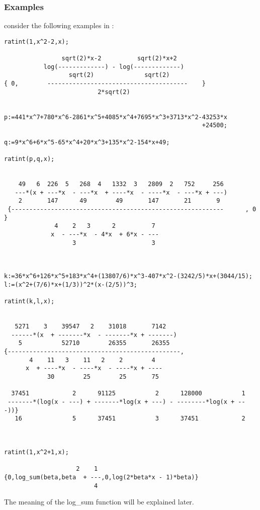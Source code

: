 \subsubsection{Examples}
consider the following examples in \REDUCE:
\begin{verbatim}
ratint(1,x^2-2,x);

                sqrt(2)*x-2          sqrt(2)*x+2
           log(-------------) - log(-------------)
                  sqrt(2)              sqrt(2)
{ 0,        ---------------------------------------    }
                          2*sqrt(2)


p:=441*x^7+780*x^6-2861*x^5+4085*x^4+7695*x^3+3713*x^2-43253*x
                                                       +24500;

q:=9*x^6+6*x^5-65*x^4+20*x^3+135*x^2-154*x+49;

ratint(p,q,x);


    49   6  226  5   268  4   1332  3   2809  2   752     256
   ---*(x + ---*x  - ---*x  + ----*x  - ----*x  - ---*x + ---)
    2       147      49        49       147       21       9
 {-----------------------------------------------------------      , 0  }
              4    2   3      2          7
             x  - ---*x  - 4*x  + 6*x - ---
                   3                     3



k:=36*x^6+126*x^5+183*x^4+(13807/6)*x^3-407*x^2-(3242/5)*x+(3044/15);
l:=(x^2+(7/6)*x+(1/3))^2*(x-(2/5))^3;

ratint(k,l,x);


   5271    3    39547   2    31018       7142
  ------*(x  + -------*x  - -------*x + -------)
    5           52710        26355       26355
{------------------------------------------------,
       4    11   3    11   2    2        4
      x  + ----*x  - ----*x  - ----*x + ----
            30        25        25       75

  37451            2      91125           2      128000           1
 -------*(log(x - ---) + -------*log(x + ---) - --------*log(x + ---))}
   16              5      37451           3      37451            2



ratint(1,x^2+1,x);

                    2    1
{0,log_sum(beta,beta  + ---,0,log(2*beta*x - 1)*beta)}
                         4
\end{verbatim}

The meaning of the log\_sum function will be explained later.

